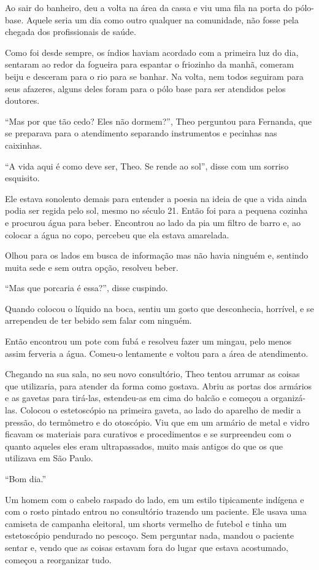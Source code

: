 Ao sair do banheiro, deu a volta na área da cassa e viu uma fila na
porta do pólo-base. Aquele seria um dia como outro qualquer na
comunidade, não fosse pela chegada dos profissionais de saúde.

Como foi desde sempre, os índios haviam acordado com a primeira luz do
dia, sentaram ao redor da fogueira para espantar o friozinho da manhã,
comeram beiju e desceram para o rio para se banhar. Na volta, nem todos
seguiram para seus afazeres, alguns deles foram para o pólo base para
ser atendidos pelos doutores.

``Mas por que tão cedo? Eles não dormem?'', Theo perguntou para
Fernanda, que se preparava para o atendimento separando instrumentos e
pecinhas nas caixinhas.

``A vida aqui é como deve ser, Theo. Se rende ao sol'', disse com um
sorriso esquisito.

Ele estava sonolento demais para entender a poesia na ideia de que a
vida ainda podia ser regida pelo sol, mesmo no século 21. Então foi para
a pequena cozinha e procurou água para beber. Encontrou ao lado da pia
um filtro de barro e, ao colocar a água no copo, percebeu que ela estava
amarelada.

Olhou para os lados em busca de informação mas não havia ninguém e,
sentindo muita sede e sem outra opção, resolveu beber.

``Mas que porcaria é essa?'', disse cuspindo.

Quando colocou o líquido na boca, sentiu um gosto que desconhecia,
horrível, e se arrependeu de ter bebido sem falar com ninguém.

Então encontrou um pote com fubá e resolveu fazer um mingau, pelo menos
assim ferveria a água. Comeu-o lentamente e voltou para a área de
atendimento.

Chegando na sua sala, no seu novo consultório, Theo tentou arrumar as
coisas que utilizaria, para atender da forma como gostava. Abriu as
portas dos armários e as gavetas para tirá-las, estendeu-as em cima do
balcão e começou a organizá-las. Colocou o estetoscópio na primeira
gaveta, ao lado do aparelho de medir a pressão, do termômetro e do
otoscópio. Viu que em um armário de metal e vidro ficavam os materiais
para curativos e procedimentos e se surpreendeu com o quanto aqueles
eles eram ultrapassados, muito mais antigos do que os que utilizava em
São Paulo.

``Bom dia.''

Um homem com o cabelo raspado do lado, em um estilo tipicamente indígena
e com o rosto pintado entrou no consultório trazendo um paciente. Ele
usava uma camiseta de campanha eleitoral, um shorts vermelho de futebol
e tinha um estetoscópio pendurado no pescoço. Sem perguntar nada, mandou
o paciente sentar e, vendo que as coisas estavam fora do lugar que
estava acostumado, começou a reorganizar tudo.

